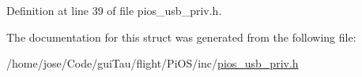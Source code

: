 Definition at line 39 of file pios\-\_\-usb\-\_\-priv.\-h.



The documentation for this struct was generated from the following file\-:\begin{DoxyCompactItemize}
\item 
/home/jose/\-Code/gui\-Tau/flight/\-Pi\-O\-S/inc/\hyperlink{pios__usb__priv_8h}{pios\-\_\-usb\-\_\-priv.\-h}\end{DoxyCompactItemize}
